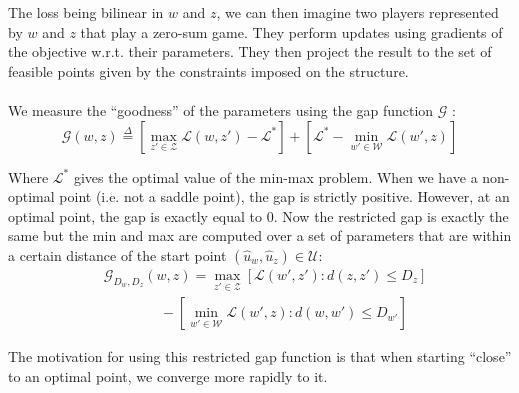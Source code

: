 \documentclass{article}
\begin{document}
The loss being bilinear in $w$ and $z$, we can then imagine two players represented by
$ w$ and $ z$ that play a zero-sum game. They perform updates using gradients of
the objective w.r.t. their parameters. They then project the result to the set
of feasible points given by the constraints imposed on the structure.\\ 
\\
We measure the ``goodness'' of the parameters using the gap function
$\mathcal{G}$ \cite{Taskaretal06}:
\begin{equation}
  \mathcal{G}( w,  z) \overset{\Delta}{=}\left[ \max_{ z' \in \mathcal{Z}}
\mathcal{L}( w, z') - \mathcal{L}^* \right] + \left[ \mathcal{L}^* -
\min_{ w' \in \mathcal{W}} \mathcal{L}( w',  z) \right]
\end{equation}

Where $\mathcal{L}^*$ gives the optimal value of the min-max problem. When we have a non-optimal point (i.e. not a saddle point), the gap is strictly positive. However, at an optimal point, the gap is exactly equal to $0$.
Now the restricted gap is exactly the same but the min and max are computed over a set of parameters that are within a certain distance of the start point
$(\hat{ u}_{ w},\hat{ u}_{ z}) \in \mathcal{U}$:
\begin{equation}
\begin{aligned}
    &\mathcal{G}_{D_{ w}, D_{ z}}( w,  z) = \max_{ z' \in \mathcal{Z}} \left[ \mathcal{L}( w',  z') : d( z,  z') \leq D_{ z} \right]\\
    &\quad\quad\quad\quad-\left [ \min_{ w' \in \mathcal{W}} \mathcal{L}( w', z) : d( w,  w') \leq D_{ w'} \right ]
\end{aligned}
\end{equation}

The motivation for using this restricted gap function is that when starting ``close'' to an optimal point, we converge more rapidly to it.
\end{document}
